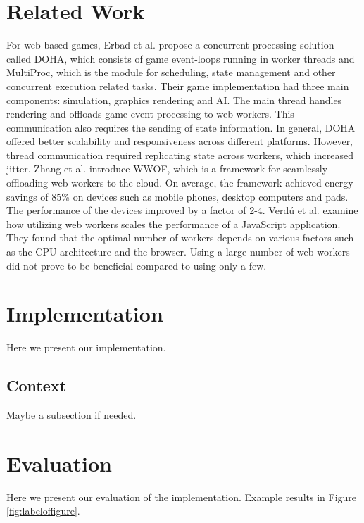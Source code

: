\documentclass[conference]{IEEEtran}
\begin{document}
\section{Related Work}
\label{sec:soa}

For web-based games, Erbad et al. \cite{doha} propose a concurrent processing solution called DOHA, which consists of game event-loops running in worker threads and MultiProc, which is the module for scheduling, state management and other concurrent execution related tasks. Their game implementation had three main components: simulation, graphics rendering and AI. The main thread handles rendering and offloads game event processing to web workers. This communication also requires the sending of state information. In general, DOHA offered better scalability and responsiveness across different platforms. However, thread communication required replicating state across workers, which increased jitter.
Zhang et al. \cite{zhang} introduce WWOF, which is a framework for seamlessly offloading web workers to the cloud. On average, the framework achieved energy savings of 85\% on devices such as mobile phones, desktop computers and pads. The performance of the devices improved by a factor of 2-4.
Verdú et al. \cite{verdu} examine how utilizing web workers scales the performance of a JavaScript application. They found that the optimal number of workers depends on various factors such as the CPU architecture and the browser. Using a large number of web workers did not prove to be beneficial compared to using only a few.

\section{Implementation}

Here we present our implementation.

\subsection{Context} 
\label{sec:context}

Maybe a subsection if needed.

\section{Evaluation}
\label{sec:sec2}

Here we present our evaluation of the implementation.
Example results in Figure \ref{fig:labeloffigure}. 
\end{document}
